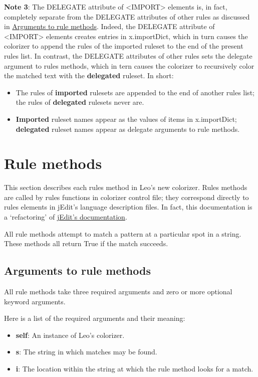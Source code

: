 \documentclass[a4paper,10pt,english]{sphinxmanual}
\begin{document}
\textbf{Note 3}: The DELEGATE attribute of \textless{}IMPORT\textgreater{} elements is, in fact,
completely separate from the DELEGATE attributes of other rules as
discussed in {\hyperref[coloring:arguments-to-rule-methods]{Arguments to rule methods}}.
Indeed, the DELEGATE attribute of \textless{}IMPORT\textgreater{} elements creates entries in
x.importDict, which in turn causes the colorizer to append the rules of the imported ruleset
to the end of the present rules list.
In contrast, the DELEGATE attributes of other rules sets the delegate argument to rules methods,
which in tern causes the colorizer to recursively color the matched text with the \textbf{delegated} ruleset.
In short:
\begin{itemize}
\item {} 
The rules of \textbf{imported} rulesets are appended to the end of another rules list;
the rules of \textbf{delegated} rulesets never are.

\item {} 
\textbf{Imported} ruleset names appear as the values of items in x.importDict;
\textbf{delegated} ruleset names appear as delegate arguments to rule methods.

\end{itemize}


\section{Rule methods}
\label{coloring:rule-methods}
This section describes each rules method in Leo's new colorizer.
Rules methods are called by rules functions in colorizer control file;
they correspond directly to rules elements in jEdit's language description files.
In fact, this documentation is a `refactoring' of \href{http://www.jedit.org/42docs/users-guide/writing-modes-part.html}{jEdit's documentation}.

All rule methods attempt to match a pattern at a particular spot in a string.
These methods all return True if the match succeeds.


\subsection{Arguments to rule methods}
\label{coloring:arguments-to-rule-methods}
All rule methods take three required arguments and zero or more optional keyword arguments.

Here is a list of the required arguments and their meaning:
\begin{itemize}
\item {} 
\textbf{self}: An instance of Leo's colorizer.

\item {} 
\textbf{s}: The string in which matches may be found.

\item {} 
\textbf{i}: The location within the string at which the rule method looks for a match.

\end{itemize}
\end{document}
